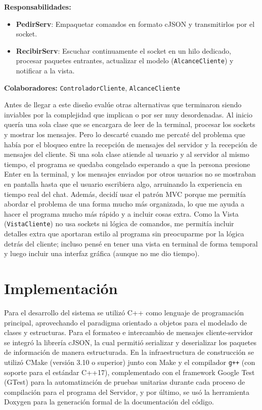 \documentclass[11pt,a4paper]{article}
\begin{document}
\begin{tcolorbox}[colback=white,colframe=black,title=\textbf{Tarjeta CRC: PedirServ y RecibirServ (Red)}, fonttitle=\bfseries]
\textbf{Responsabilidades:}
\begin{itemize}
    \item \textbf{PedirServ}: Empaquetar comandos en formato cJSON y transmitirlos por el socket.
    \item \textbf{RecibirServ}: Escuchar continuamente el socket en un hilo dedicado, procesar paquetes entrantes, actualizar el modelo (\texttt{AlcanceCliente}) y notificar a la vista.
\end{itemize}
\tcblower
\textbf{Colaboradores:} \texttt{ControladorCliente}, \texttt{AlcanceCliente}
\end{tcolorbox}

Antes de llegar a este diseño evalúe otras alternativas que terminaron siendo inviables por la complejidad que implican o por ser muy desordenadas. Al inicio quería una sola clase que se encargara de leer de la terminal, procesar los sockets y mostrar los mensajes. Pero lo descarté cuando me percaté del problema que había por el bloqueo entre la recepción de mensajes del servidor y la recepción de mensajes del cliente. Si una sola clase atiende al usuario y al servidor al mismo tiempo, el programa se quedaba congelado esperando a que la persona presione Enter en la terminal, y los mensajes enviados por otros usuarios no se mostraban en pantalla hasta que el usuario escribiera algo, arruinando la experiencia en tiempo real del chat. Además, decidí usar el patrón MVC porque me permitía abordar el problema de una forma mucho más organizada, lo que me ayuda a hacer el programa mucho más rápido y a incluir cosas extra. Como la Vista (\texttt{VistaCliente}) no usa sockets ni lógica de comandos, me permitía incluir detalles extra que aportaran estilo al programa sin preocuparme por la lógica detrás del cliente; incluso pensé en tener una vista en terminal de forma temporal y luego incluir una interfaz gráfica (aunque no me dio tiempo).

\section{Implementación}

Para el desarrollo del sistema se utilizó C++ como lenguaje de programación principal, aprovechando el paradigma orientado a objetos para el modelado de clases y estructuras. Para el formateo e intercambio de mensajes cliente-servidor se integró la librería cJSON, la cual permitió serializar y deserializar los paquetes de información de manera estructurada. En la infraestructura de construcción se utilizó CMake (versión 3.10 o superior) junto con Make y el compilador \texttt{g++} (con soporte para el estándar C++17), complementado con el framework Google Test (GTest) para la automatización de pruebas unitarias durante cada proceso de compilación para el programa del Servidor, y por último, se usó la herramienta Doxygen para la generación formal de la documentación del código.
\end{document}

